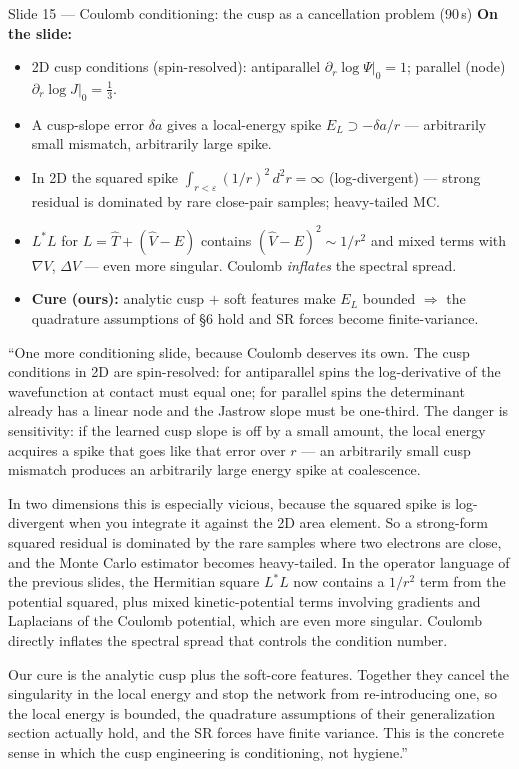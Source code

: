 \documentclass[11pt]{article}
\begin{document}
\begin{slide}{Slide 15 --- Coulomb conditioning: the cusp as a cancellation problem (90\,s)}
\textbf{On the slide:}
\begin{itemize}[leftmargin=*]
\item 2D cusp conditions (spin-resolved): antiparallel $\partial_r\log\Psi|_0=1$; parallel (node)
$\partial_r\log J|_0=\tfrac13$.
\item A cusp-slope error $\delta a$ gives a local-energy spike $E_L\supset -\delta a/r$ --- arbitrarily
small mismatch, arbitrarily large spike.
\item In 2D the squared spike $\int_{r<\varepsilon}(1/r)^2\,d^2r=\infty$ (log-divergent) --- strong
residual is dominated by rare close-pair samples; heavy-tailed MC.
\item $L^\ast L$ for $L=\hat T+(\hat V-E)$ contains $(\hat V-E)^2\sim 1/r^2$ and mixed terms with
$\nabla V$, $\Delta V$ --- even more singular. Coulomb \emph{inflates} the spectral spread.
\item \textbf{Cure (ours):} analytic cusp $+$ soft features make $E_L$ bounded $\Rightarrow$ the
quadrature assumptions of \S6 hold and SR forces become finite-variance.
\end{itemize}
\end{slide}

\begin{say}
``One more conditioning slide, because Coulomb deserves its own. The cusp conditions in 2D are
spin-resolved: for antiparallel spins the log-derivative of the wavefunction at contact must equal
one; for parallel spins the determinant already has a linear node and the Jastrow slope must be
one-third. The danger is sensitivity: if the learned cusp slope is off by a small amount, the local
energy acquires a spike that goes like that error over $r$ --- an arbitrarily small cusp mismatch
produces an arbitrarily large energy spike at coalescence.

In two dimensions this is especially vicious, because the squared spike is log-divergent when you
integrate it against the 2D area element. So a strong-form squared residual is dominated by the rare
samples where two electrons are close, and the Monte Carlo estimator becomes heavy-tailed. In the
operator language of the previous slides, the Hermitian square $L^\ast L$ now contains a $1/r^2$ term
from the potential squared, plus mixed kinetic-potential terms involving gradients and Laplacians of
the Coulomb potential, which are even more singular. Coulomb directly inflates the spectral spread
that controls the condition number.

Our cure is the analytic cusp plus the soft-core features. Together they cancel the singularity in
the local energy and stop the network from re-introducing one, so the local energy is bounded, the
quadrature assumptions of their generalization section actually hold, and the SR forces have finite
variance. This is the concrete sense in which the cusp engineering is conditioning, not hygiene.''
\end{say}
\end{document}
